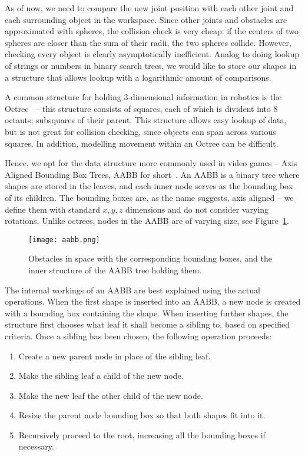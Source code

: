As of now, we need to compare the new joint position with each other joint and each surrounding object in the workspace. Since other joints and obstacles are approximated with spheres, the collision check is very cheap: if the centers of two spheres are closer than the sum of their radii, the two spheres collide. However, checking every object is clearly asymptotically inefficient. Analog to doing lookup of strings or numbers in binary search trees, we would like to store our shapes in a structure that allows lookup with a logarithmic amount of comparisons.

A common structure for holding 3-dimensional information in robotics is the Octree~\cite{octree} -- this structure consists of squares, each of which is divident into 8 octants; subsquares of their parent. This structure allows easy lookup of data, but is not great for collision checking, since objects can span across various squares. In addition, modelling movement within an Octree can be difficult.

Hence, we opt for the data structure more commonly used in video games -- Axis Aligned Bounding Box Trees, AABB for short~\cite{aabb}. An AABB is a binary tree where shapes are stored in the leaves, and each inner node serves as the bounding box of its children. The bounding boxes are, as the name suggests, axis aligned -- we define them with standard $x, y, z$ dimensions and do not consider varying rotations. Unlike octrees, nodes in the AABB are of varying size, see Figure~\ref{fig:aabb}.

\begin{figure}
  \centering
  \texttt{[image: aabb.png]}
  \caption{Obstacles in space with the corresponding bounding boxes, and the inner structure of the AABB tree holding them.}\label{fig:aabb}
\end{figure}

The internal workings of an AABB are best explained using the actual operations. When the first shape is inserted into an AABB, a new node is created with a bounding box containing the shape. When inserting further shapes, the structure first chooses what leaf it shall become a sibling to, based on specified criteria.
Once a sibling has been chosen, the following operation proceeds:

\begin{enumerate}
\item Create a new parent node in place of the sibling leaf.
\item Make the sibling leaf a child of the new node.
\item Make the new leaf the other child of the new node.
\item Resize the parent node bounding box so that both shapes fit into it.
\item Recursively proceed to the root, increasing all the bounding boxes if necessary.
\end{enumerate}

